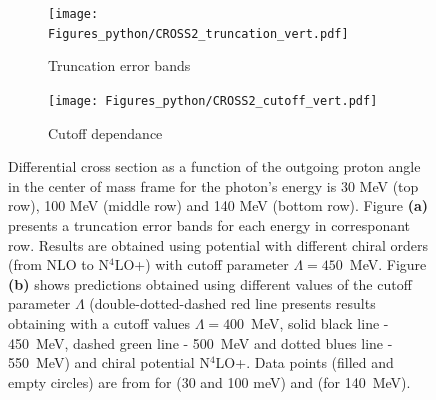     \begin{figure}[h]
        \centering
        \begin{subfigure}[b]{0.46\textwidth}
            \texttt{[image: Figures\_python/CROSS2\_truncation\_vert.pdf]}
            \caption{Truncation error bands}
            \label{Diff_cross_truncation}
        \end{subfigure}
        \begin{subfigure}[b]{0.46\textwidth}
            \texttt{[image: Figures\_python/CROSS2\_cutoff\_vert.pdf]}
            \caption{Cutoff dependance}
            \label{Diff_cross_cutoff}
        \end{subfigure}
        \caption{Differential cross section as a function of the outgoing proton angle in the center of mass frame 
        for the photon's energy is 30 MeV (top row), 100 MeV (middle row) and 140 MeV (bottom row).
        Figure {\bf(a)} presents a truncation error bands for each energy in corresponant row. 
        Results are obtained using potential with different chiral orders (from NLO to N$^4$LO+) 
        with cutoff parameter $\Lambda=450$~MeV.
        Figure {\bf (b)} shows predictions obtained using different values of the cutoff parameter $\Lambda$
        (double-dotted-dashed red line presents results obtaining with 
        a cutoff values $\Lambda=400$~MeV, solid black line - 450~MeV, dashed green line - 500~MeV
        and dotted blues line - 550~MeV) and chiral potential N$^4$LO+. 
        Data points (filled and empty circles) are from \cite{Ying_Experiment_Deut}
        for (30 and 100 meV)
        and \cite{DeSanctis_Experiment_Deut} (for 140~MeV).}
    \end{figure}



